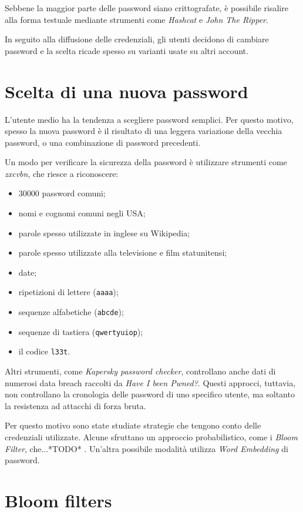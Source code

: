 Sebbene la maggior parte delle password siano crittografate, è possibile risalire alla forma testuale mediante strumenti come \emph{Hashcat} e \emph{John The Ripper}.

In seguito alla diffusione delle credenziali, gli utenti decidono di cambiare password e la scelta ricade spesso su varianti usate su altri account.
\section{Scelta di una nuova password}

L'utente medio ha la tendenza a scegliere password semplici. Per questo motivo, spesso la nuova password è il risultato di una leggera variazione della vecchia password, o una combinazione di password precedenti. \cite{hypr}

Un modo per verificare la sicurezza della password è utilizzare strumenti come \emph{zxcvbn}, che riesce a riconoscere:
\begin{itemize}
    \item 30000 password comuni;
    \item nomi e cognomi comuni negli USA;
    \item parole spesso utilizzate in inglese su Wikipedia;
    \item parole spesso utilizzate alla televisione e film statunitensi;
    \item date;
    \item ripetizioni di lettere (\texttt{aaaa});
    \item sequenze alfabetiche (\texttt{abcde});
    \item sequenze di tastiera (\texttt{qwertyuiop});
    \item il codice \texttt{l33t}.    
\end{itemize}

Altri strumenti, come \emph{Kapersky password checker}, controllano anche dati di numerosi data breach raccolti da \textit{Have I been Pwned?}.
Questi approcci, tuttavia, non controllano la cronologia delle password di uno specifico utente, ma soltanto la resistenza ad attacchi di forza bruta.

Per questo motivo sono state studiate strategie che tengono conto delle credenziali utilizzate.
Alcune sfruttano un approccio probabilistico, come i \emph{Bloom Filter}, che...*TODO* . Un'altra possibile modalità utilizza \emph{Word Embedding} di password.

\section{Bloom filters}

